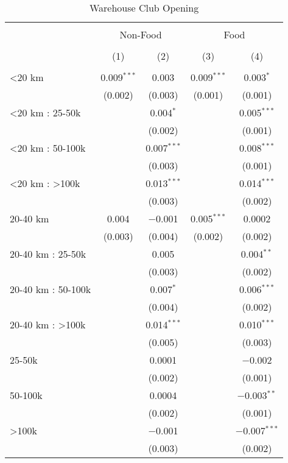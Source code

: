 
\begin{table}[!htbp] \centering 
  \caption{Warehouse Club Opening} 
  \label{tab:clubOpening} 
\begin{tabular}{@{\extracolsep{5pt}}lcccc} 
\\[-1.8ex]\hline 
\hline \\[-1.8ex] 
 & \multicolumn{2}{c}{Non-Food} & \multicolumn{2}{c}{Food} \\ 
\\[-1.8ex] & (1) & (2) & (3) & (4)\\ 
\hline \\[-1.8ex] 
 <20 km & 0.009$^{***}$ & 0.003 & 0.009$^{***}$ & 0.003$^{*}$ \\ 
  & (0.002) & (0.003) & (0.001) & (0.001) \\ 
  <20 km : 25-50k &  & 0.004$^{*}$ &  & 0.005$^{***}$ \\ 
  &  & (0.002) &  & (0.001) \\ 
  <20 km : 50-100k &  & 0.007$^{***}$ &  & 0.008$^{***}$ \\ 
  &  & (0.003) &  & (0.001) \\ 
  <20 km : >100k &  & 0.013$^{***}$ &  & 0.014$^{***}$ \\ 
  &  & (0.003) &  & (0.002) \\ 
  20-40 km & 0.004 & $-$0.001 & 0.005$^{***}$ & 0.0002 \\ 
  & (0.003) & (0.004) & (0.002) & (0.002) \\ 
  20-40 km : 25-50k &  & 0.005 &  & 0.004$^{**}$ \\ 
  &  & (0.003) &  & (0.002) \\ 
  20-40 km : 50-100k &  & 0.007$^{*}$ &  & 0.006$^{***}$ \\ 
  &  & (0.004) &  & (0.002) \\ 
  20-40 km : >100k &  & 0.014$^{***}$ &  & 0.010$^{***}$ \\ 
  &  & (0.005) &  & (0.003) \\ 
  25-50k &  & 0.0001 &  & $-$0.002 \\ 
  &  & (0.002) &  & (0.001) \\ 
  50-100k &  & 0.0004 &  & $-$0.003$^{**}$ \\ 
  &  & (0.002) &  & (0.001) \\ 
  >100k &  & $-$0.001 &  & $-$0.007$^{***}$ \\ 
  &  & (0.003) &  & (0.002) \\ 

\end{tabular}
\end{table}
